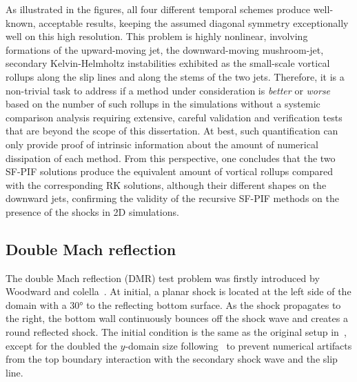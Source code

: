 As illustrated in the figures, all four different temporal schemes produce well-known,
acceptable results, keeping the assumed diagonal symmetry exceptionally well on this high resolution.
This problem is highly nonlinear, involving formations of the upward-moving jet,
the downward-moving mushroom-jet, secondary Kelvin-Helmholtz instabilities exhibited
as the small-scale vortical rollups along the slip lines and along the stems of the two jets.
Therefore, it is a non-trivial task to address if a method under consideration is
\textit{better} or \textit{worse} based on the number of such rollups in the simulations
without a systemic comparison analysis requiring extensive, careful validation and verification tests
that are beyond the scope of this dissertation.
At best, such quantification can only provide
proof of intrinsic information about the amount of numerical dissipation of each method.
From this perspective, one concludes that the two SF-PIF solutions produce
the equivalent amount of vortical rollups compared with the corresponding RK solutions,
although their different shapes on the downward jets,
confirming the validity of the recursive SF-PIF methods
on the presence of the shocks in 2D simulations.





\subsection{Double Mach reflection}\label{subsec:dmr_weno}

The double Mach reflection (DMR) test problem was firstly introduced by
Woodward and colella~\cite{woodward1984numerical}.
At initial, a planar shock is located at the left side of the domain
with a \( \ang{30} \) to the reflecting bottom surface.
As the shock propagates to the right, the bottom wall
continuously bounces off the shock wave and creates a round reflected shock.
The initial condition is the same as the original setup in~\cite{woodward1984numerical},
except for the doubled the \( y \)-domain size following~\cite{kemm2016proper}
to prevent numerical artifacts from the top boundary interaction with the
secondary shock wave and the slip line.

